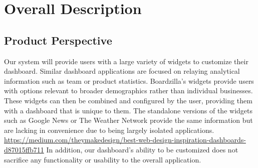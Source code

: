 \documentclass[]{article}
\begin{document}

\section{Overall Description}
\label{sec:overall_description}


\subsection{Product Perspective}
\label{sub:product_perspective}
Our system will provide users with a large variety of widgets to customize their dashboard. Similar dashboard applications are focused on relaying analytical information such as team or product statistics. Boardzilla's widgets provide users with options relevant to broader demographics rather than individual businesses. These widgets can then be combined and configured by the user, providing them with a dashboard that is unique to them. The standalone versions of the widgets such as Google News or The Weather Network provide the same information but are lacking in convenience due to being largely isolated applications. \url{https://medium.com/theymakedesign/best-web-design-inspiration-dashboards-d87015ffb711} In addition, our dashboard's ability to be customized does not sacrifice any functionality or usability to the overall application.
\begin{enumerate}[a)]
	
\end{enumerate}
\end{document}
